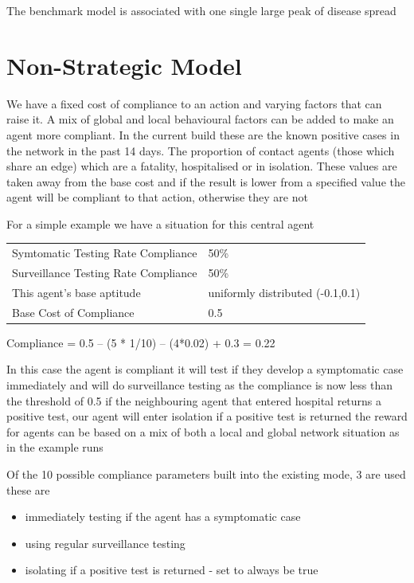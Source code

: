 \documentclass{article}
\begin{document}
The benchmark model is associated with one single large peak of disease spread

\newpage

\section{Non-Strategic Model}
We have a fixed cost of compliance to an action and varying factors that can raise it. A mix of global and local behavioural factors can be added to make an agent more compliant. In the current build these are the known positive cases in the network in the past 14 days. The proportion of contact agents (those which share an edge) which are a fatality, hospitalised or in isolation. These values are taken away from the base cost and if the result is lower from a specified value the agent will be compliant to that action, otherwise they are not

For a simple example we have a situation for this central agent 



\begin{table}[h!]
\begin{tabular}{ll}
Symtomatic Testing Rate Compliance & 50\% \\
Surveillance Testing Rate Compliance & 50\% \\
This agent’s base aptitude & uniformly distributed (-0.1,0.1) \\
Base Cost of Compliance & 0.5 
\end{tabular}
\end{table}

Compliance = 0.5 – (5 * 1/10) – (4*0.02) + 0.3 = 0.22



In this case the agent is compliant
it will test if they develop a symptomatic case immediately and will do surveillance testing as the compliance is now less than the threshold of 0.5
if the neighbouring agent that entered hospital returns a positive test, our agent will enter isolation if a positive test is returned 
the reward for agents can be based on a mix of both a local and global network situation as in the example runs

Of the 10 possible compliance parameters built into the existing mode, 3 are used these are
\begin{itemize}
\item immediately testing if the agent has a symptomatic case
\item using regular surveillance testing
\item isolating if a positive test is returned - set to always be true
\end{itemize}
\end{document}
